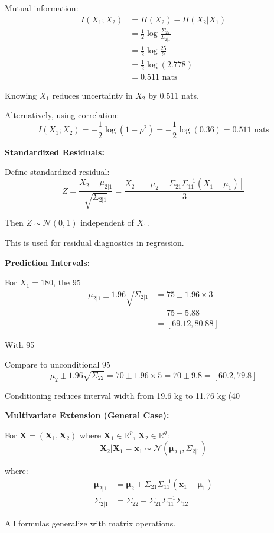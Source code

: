 \documentclass[12pt]{article}
\begin{document}
\begin{explanation}
Mutual information:
\begin{align*}
I(X_1; X_2) &= H(X_2) - H(X_2 | X_1) \\
&= \frac{1}{2}\log\frac{\Sigma_{22}}{\Sigma_{2|1}} \\
&= \frac{1}{2}\log\frac{25}{9} \\
&= \frac{1}{2}\log(2.778) \\
&= 0.511 \text{ nats}
\end{align*}

Knowing $X_1$ reduces uncertainty in $X_2$ by 0.511 nats.

Alternatively, using correlation:
\[
I(X_1; X_2) = -\frac{1}{2}\log(1 - \rho^2) = -\frac{1}{2}\log(0.36) = 0.511 \text{ nats}
\]

\textbf{Standardized Residuals:}

Define standardized residual:
\[
Z = \frac{X_2 - \mu_{2|1}}{\sqrt{\Sigma_{2|1}}} = \frac{X_2 - [\mu_2 + \Sigma_{21}\Sigma_{11}^{-1}(X_1 - \mu_1)]}{3}
\]

Then $Z \sim \mathcal{N}(0, 1)$ independent of $X_1$.

This is used for residual diagnostics in regression.

\textbf{Prediction Intervals:}

For $X_1 = 180$, the 95%
\begin{align*}
\mu_{2|1} \pm 1.96\sqrt{\Sigma_{2|1}} &= 75 \pm 1.96 \times 3 \\
&= 75 \pm 5.88 \\
&= [69.12, 80.88]
\end{align*}

With 95%

Compare to unconditional 95%
\[
\mu_2 \pm 1.96\sqrt{\Sigma_{22}} = 70 \pm 1.96 \times 5 = 70 \pm 9.8 = [60.2, 79.8]
\]

Conditioning reduces interval width from 19.6 kg to 11.76 kg (40%

\textbf{Multivariate Extension (General Case):}

For $\mathbf{X} = (\mathbf{X}_1, \mathbf{X}_2)$ where $\mathbf{X}_1 \in \mathbb{R}^p$, $\mathbf{X}_2 \in \mathbb{R}^q$:
\[
\mathbf{X}_2 | \mathbf{X}_1 = \mathbf{x}_1 \sim \mathcal{N}(\boldsymbol{\mu}_{2|1}, \Sigma_{2|1})
\]

where:
\begin{align*}
\boldsymbol{\mu}_{2|1} &= \boldsymbol{\mu}_2 + \Sigma_{21}\Sigma_{11}^{-1}(\mathbf{x}_1 - \boldsymbol{\mu}_1) \\
\Sigma_{2|1} &= \Sigma_{22} - \Sigma_{21}\Sigma_{11}^{-1}\Sigma_{12}
\end{align*}

All formulas generalize with matrix operations.

\end{explanation}
\end{document}
